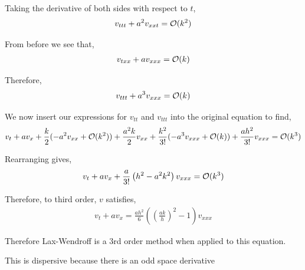 \documentclass[10pt]{article}
\begin{document}
\begin{solution}[Solution]
\begin{enumerate}[label=(\alph*)]
        Taking the derivative of both sides with respect to \( t \),
        \begin{align*}
            v_{ttt} + a^2 v_{xxt} = \mathcal{O}(k^2)
        \end{align*}
        
        From before we see that,
        \begin{align*}
            v_{txx} + av_{xxx} = \mathcal{O}(k)
        \end{align*}
          
        Therefore,
        \begin{align*}
            v_{ttt} + a^3 v_{xxx} = \mathcal{O}(k) 
        \end{align*}
        
        We now insert our expressions for \( v_{tt} \) and \( v_{ttt} \) into the original equation to find,
        \begin{align*}
            v_t + av_x + \frac{k}{2}(-a^2v_{xx} + \mathcal{O}(k^2)) + \frac{a^2k}{2}v_{xx} + \frac{k^2}{3!}(-a^3v_{xxx} + \mathcal{O}(k)) + \frac{ah^2}{3!}v_{xxx} = \mathcal{O}(k^3)
        \end{align*}
        
        Rearranging gives,
        \begin{align*}
            v_t + av_x + \frac{a}{3!}\left( h^2-a^2k^2\right)v_{xxx} = \mathcal{O}(k^3)
        \end{align*}
        
        Therefore, to third order, \( v \) satisfies,
        \begin{align*}
            v_t + av_x = \frac{ah^2}{6} \left( \left( \frac{ak}{h} \right)^2 - 1  \right)v_{xxx}
        \end{align*}

        Therefore Lax-Wendroff is a 3rd order method when applied to this equation.
        
        This is dispersive because there is an odd space derivative


\end{enumerate} 
\end{solution}
\end{document}
